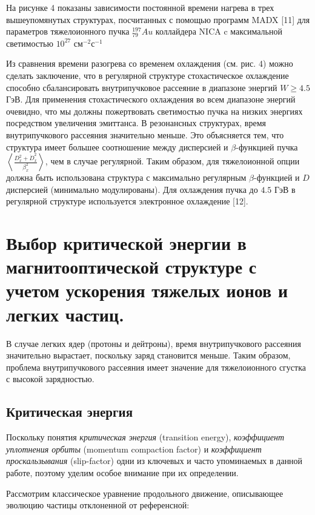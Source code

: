 \noindent На рисунке 4 показаны зависимости постоянной времени нагрева в трех вышеупомянутых структурах, посчитанных с помощью программ MADX [11] для параметров тяжелоионного пучка ${_{79}^{197}}Au$ коллайдера NICA c максимальной светимостью ${10}^{27}$ см$^{-2}$с$^{-1}$

\noindent Из сравнения времени разогрева со временем охлаждения (см. рис. 4) можно сделать заключение, что в регулярной структуре стохастическое охлаждение способно сбалансировать внутрипучковое рассеяние в диапазоне энергий $W\geq4.5$ ГэВ. Для применения стохастического охлаждения во всем диапазоне энергий очевидно, что мы должны пожертвовать светимостью пучка на низких энергиях посредством увеличения эмиттанса. В резонансных структурах, время внутрипучкового рассеяния значительно меньше. Это объясняется тем, что структура имеет большее соотношение между дисперсией и $\beta$-функцией пучка $\left\langle\frac{D_x^2+{\dot{D}}_x^2}{\beta_x^2}\right\rangle$, чем в случае регулярной. Таким образом, для тяжелоионной опции должна быть использована структура с максимально регулярным $\beta$-функцией и $D$ дисперсией (минимально модулированы). Для охлаждения пучка до $4.5$ ГэВ в регулярной структуре используется электронное охлаждение [12].

\section{Выбор критической энергии в магнитооптической структуре с учетом ускорения тяжелых ионов и легких частиц.}\label{sec:ch:ions_light/transition}

\noindent В случае легких ядер (протоны и дейтроны), время внутрипучкового рассеяния значительно вырастает, поскольку заряд становится меньше. Таким образом, проблема внутрипучкового рассеяния имеет значение для тяжелоионного сгустка с высокой зарядностью.

\subsection{Критическая энергия}\label{sec:ch:ions_light/transition/energy}
\par Поскольку понятия \textit{критическая энергия} (transition energy), \textit{коэффициент уплотнения орбиты} (momentum compaction factor) и \textit{коэффициент проскальзывания} (slip-factor) одни из ключевых и часто упоминаемых  в данной работе, поэтому уделим особое внимание при их определении.
\par Рассмотрим классическое уравнение продольного движение, описывающее эволюцию частицы отклоненной от референсной:

